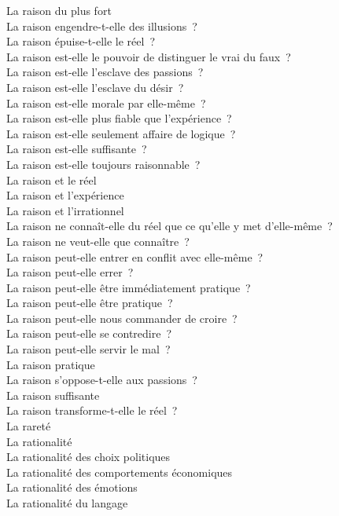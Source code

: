 \documentclass[a4paper,12pt]{article}
\begin{document}
La raison du plus fort \\
La raison engendre-t-elle des illusions ? \\
La raison épuise-t-elle le réel ? \\
La raison est-elle le pouvoir de distinguer le vrai du faux ? \\
La raison est-elle l'esclave des passions ? \\
La raison est-elle l'esclave du désir ? \\
La raison est-elle morale par elle-même ? \\
La raison est-elle plus fiable que l'expérience ? \\
La raison est-elle seulement affaire de logique ? \\
La raison est-elle suffisante ? \\
La raison est-elle toujours raisonnable ? \\
La raison et le réel \\
La raison et l'expérience \\
La raison et l'irrationnel \\
La raison ne connaît-elle du réel que ce qu'elle y met d'elle-même ? \\
La raison ne veut-elle que connaître ? \\
La raison peut-elle entrer en conflit avec elle-même ? \\
La raison peut-elle errer ? \\
La raison peut-elle être immédiatement pratique ? \\
La raison peut-elle être pratique ? \\
La raison peut-elle nous commander de croire ? \\
La raison peut-elle se contredire ? \\
La raison peut-elle servir le mal ? \\
La raison pratique \\
La raison s'oppose-t-elle aux passions ? \\
La raison suffisante \\
La raison transforme-t-elle le réel ? \\
La rareté \\
La rationalité \\
La rationalité des choix politiques \\
La rationalité des comportements économiques \\
La rationalité des émotions \\
La rationalité du langage \\
\end{document}

